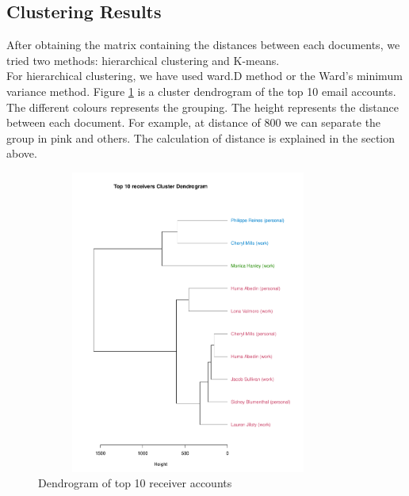\subsection*{Clustering Results}
After obtaining the matrix containing the distances between each documents, we tried two methods: hierarchical clustering and K-means. 
\\
For hierarchical clustering, we have used ward.D method or the Ward's minimum variance method. Figure \ref{fig:dendr} is a cluster dendrogram of the top 10 email accounts. The different colours represents the grouping. The height represents the distance between each document. For example, at distance of 800 we can separate the group in pink and others. The calculation of distance is explained in the section above.
\begin{figure}[h!]
    \centering
    \includegraphics[width=10cm,height=10cm]
    {daitong_and_yihe/clusterp}
    \caption{Dendrogram of top 10 receiver accounts}
    \label{fig:dendr}
\end{figure}

